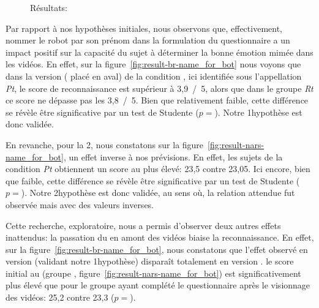 \begin{figure}[!h]
\begin{minipage}{0.55\linewidth}
                \label{fig:result-br-name_for_bot}
            \end{minipage}
            \caption{Résultats: }
            \label{fig:result-name_for_bot}
            \end{figure}\par%
            Par rapport à nos hypothèses initiales, nous observons que, effectivement, nommer le robot par son prénom dans la formulation du questionnaire a un impact positif sur la capacité du sujet à déterminer la bonne émotion mimée dans les vidéos. En effet, sur la figure~\ref{fig:result-br-name_for_bot} nous voyons que dans la version  ( placé en aval) de la condition , ici identifiée sous l'appellation \textit{Pt}, le score de reconnaissance est supérieur à 3,9~/~5, alors que dans le groupe \textit{Rt} ce score ne dépasse pas les 3,8~/~5. Bien que relativement faible, cette différence se révèle être significative par un test de Studente ($p=$). Notre 1\iere hypothèse est donc validée. \par%
            En revanche, pour la 2\nde, nous constatons sur la figure~\ref{fig:result-nars-name_for_bot}, un effet inverse à nos prévisions. En effet, les sujets de la condition \textit{Pt} obtiennent un score au  plus élevé: 23,5 contre 23,05. Ici encore, bien que faible, cette différence se révèle être significative par un test de Studente ($p=$). Notre 2\nde hypothèse est donc  validée, au sens où, la relation attendue fut observée mais avec des valeurs inverses.\par%
            Cette recherche, exploratoire, nous a permis d'observer deux autres effets inattendus: \Li la passation du  en amont des vidéos biaise la reconnaissance. En effet, sur la figure~\ref{fig:result-br-name_for_bot}, nous constatons que l'effet observé en version  (validant notre 1\iere hypothèse) disparaît totalement en version . \ii le score initial au  (groupe , figure~\ref{fig:result-nars-name_for_bot}) est significativement plus élevé que pour le groupe ayant complété le questionnaire après le visionnage des vidéos: 25,2 contre 23,3 ($p=$).
